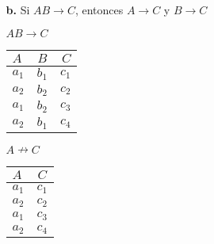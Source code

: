 \documentclass[12pt, letterpaper]{article}
\begin{document}
\begin{itemize}
\begin{itemize}
\begin{multicols}{2}
                                \end{multicols}

            \item[\textbf{b.}]  Si $AB \rightarrow C$, 
                                    entonces $A \rightarrow C$ 
                                    y $B \rightarrow C$ 

                                        
                                \begin{multicols}{3}

                                    $AB\rightarrow C$
                                        \begin{tabular}{| l | c | r |}
                                            \hline
                                            $A$ & $B$ & $C$\\
                                            \hline 
                                            $a_{1}$ & $b_{1}$ & $c_{1}$ \\
                                            $a_{2}$ & $b_{2}$ & $c_{2}$ \\
                                            $a_{1}$ & $b_{2}$ & $c_{3}$ \\
                                            $a_{2}$ & $b_{1}$ & $c_{4}$ \\
                                            \hline
                                        \end{tabular}
                                    
                                    $A \nrightarrow C$
                                        \begin{tabular}{| l | c | }
                                            \hline
                                            $A$ & $C$ \\
                                            \hline 
                                            $a_{1}$ & $c_{1}$ \\
                                            $a_{2}$ & $c_{2}$ \\
                                            $a_{1}$ & $c_{3}$ \\
                                            $a_{2}$ & $c_{4}$ \\
                                            \hline
                                        \end{tabular}


\end{multicols}
\end{itemize}
\end{itemize}
\end{document}

